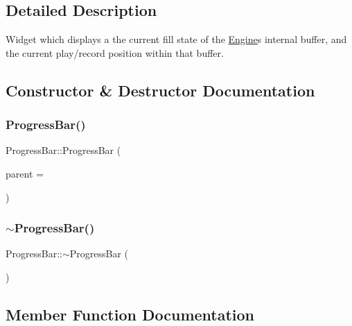 \subsection{Detailed Description}
Widget which displays a the current fill state of the \hyperlink{class_engine}{Engine}\textquotesingle{}s internal buffer, and the current play/record position within that buffer. 

\subsection{Constructor \& Destructor Documentation}
\hypertarget{class_progress_bar_a996d2532fcf95da096907a1a272052e4}{}\label{class_progress_bar_a996d2532fcf95da096907a1a272052e4} 
\subsubsection{\texorpdfstring{Progress\+Bar()}{ProgressBar()}}
{\footnotesize\ttfamily Progress\+Bar\+::\+Progress\+Bar (\begin{DoxyParamCaption}\item[{Q\+Object $\ast$}]{parent = {} }\end{DoxyParamCaption})\hspace{0.3cm}{\ttfamily [explicit]}}

\hypertarget{class_progress_bar_aa0ced60c0ade467a4602c35443e7bc78}{}\label{class_progress_bar_aa0ced60c0ade467a4602c35443e7bc78} 
\subsubsection{\texorpdfstring{$\sim$\+Progress\+Bar()}{~ProgressBar()}}
{\footnotesize\ttfamily Progress\+Bar\+::$\sim$\+Progress\+Bar (\begin{DoxyParamCaption}{ }\end{DoxyParamCaption})}



\subsection{Member Function Documentation}
\hypertarget{class_progress_bar_a3b191a0ae258461a6be7a8e6408c4751}{}\label{class_progress_bar_a3b191a0ae258461a6be7a8e6408c4751} 
